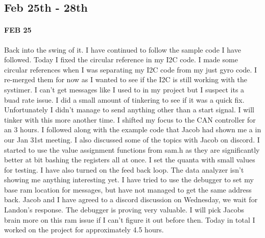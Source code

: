 \documentclass{article}
\begin{document}
\subsection{Feb 25th - 28th}
\paragraph{FEB 25} Back into the swing of it. I have continued to follow the sample code I have followed. Today I fixed the circular reference in my I2C code. I made some circular references when I was separating my I2C code from my just gyro code. I re-merged them for now as I wanted to see if the I2C is still working with the systimer. I can't get messages like I used to in my project but I suspect its a buad rate issue. I did a small amount of tinkering to see if it was a quick fix. Unfortunately I didn't manage to send anything other than a start signal. I will tinker with this more another time. I shifted my focus to the CAN controller for an  3 hours. I followed along with the example code that Jacob had shown me a in our Jan 31st meeting. I also discussed some of the topics with Jacob on discord. I started to use the value assignment functions from sam.h as they are significantly better at bit bashing the registers all at once. I set the quanta with small values for testing. I have also turned on the feed back loop. The data analyzer isn't showing me anything interesting yet. I have tried to use the debugger to set my base ram location for messages, but have not managed to get the same address back. Jacob and I have agreed to a discord discussion on Wednesday, we wait for Landon's response. The debugger is proving very valuable. I will pick Jacobs brain more on this ram issue if I can't figure it out before then. Today in total I worked on the project for approximately 4.5 hours.
\end{document}
